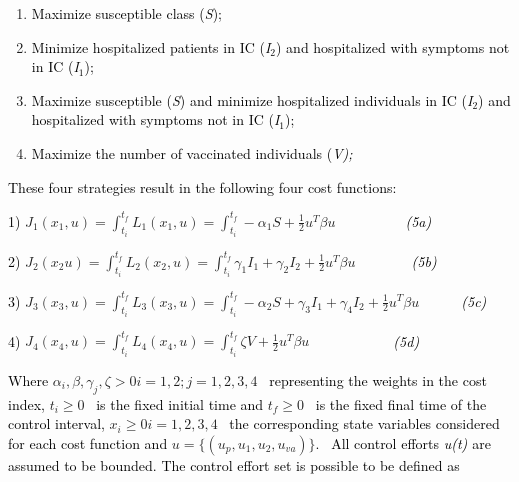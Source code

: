 \documentclass[a4paper]{article}
\providecommand\textsubscript[1]{\ensuremath{{}_{\text{#1}}}}
\begin{document}
\begin{enumerate}
\item \textcolor{black}{Maximize susceptible class (}\textit{\textcolor{black}{S}}\textcolor{black}{); }
\item \textcolor{black}{Minimize hospitalized patients in IC
(}\textit{\textcolor{black}{I}}\textit{\textcolor{black}{\textsubscript{2}}}\textcolor{black}{) and hospitalized with
symptoms not in IC (}\textit{\textcolor{black}{I}}\textit{\textcolor{black}{\textsubscript{1}}}\textcolor{black}{);}
\item \textcolor{black}{Maximize susceptible (}\textit{\textcolor{black}{S}}\textcolor{black}{) and minimize
hospitalized individuals in IC
(}\textit{\textcolor{black}{I}}\textit{\textcolor{black}{\textsubscript{2}}}\textcolor{black}{) and hospitalized with
symptoms not in IC (}\textit{\textcolor{black}{I}}\textit{\textcolor{black}{\textsubscript{1}}}\textcolor{black}{);}
\item \textcolor{black}{Maximize the number of vaccinated individuals (}\textit{\textcolor{black}{V);}}
\end{enumerate}
\textcolor{black}{These four strategies result in the following four cost functions: }

\textcolor{black}{1) } $J_1\left(x_1,u\right)=\int _{t_i}^{t_f}L_1\left(x_1,u\right)=\int _{t_i}^{t_f}-\alpha _1S+\frac
1 2u^T\mathit{\beta u}$\textcolor{black}{\ \ \ \ \ \ \ \ \ \ }\textit{\textcolor{black}{(5a)}}

\textcolor{black}{2) } $J_2\left(x_2u\right)=\int _{t_i}^{t_f}L_2\left(x_2,u\right)=\int _{t_i}^{t_f}\gamma _1I_1+\gamma
_2I_2+\frac 1 2u^T\mathit{\beta u}$\textcolor{black}{\ \ \ \ \ \ \ \ }\textit{\textcolor{black}{(5b)}}

\textcolor{black}{3) } $J_3\left(x_3,u\right)=\int _{t_i}^{t_f}L_3\left(x_3,u\right)=\int _{t_i}^{t_f}-\alpha _2S+\gamma
_3I_1+\gamma _4I_2+\frac 1 2u^T\mathit{\beta u}$\textcolor{black}{\ \ \ \ \ \ }\textit{\textcolor{black}{(5c)}}

\textcolor{black}{4) } $J_4\left(x_4,u\right)=\int _{t_i}^{t_f}L_4\left(x_4,u\right)=\int _{t_i}^{t_f}\mathit{\zeta
V}+\frac 1 2u^T\mathit{\beta u}$\textcolor{black}{\ \ \ \ \ \ \ \ \ \ \ \ }\textit{\textcolor{black}{(5d)}}

\textcolor{black}{Where } $\alpha _i,\beta ,\gamma _j,\zeta >0i=1,2;j=1,2,3,4$ \textcolor{black}{\ representing the
weights in the cost index, } $t_i{\geq}0$ \textcolor{black}{\ is the fixed initial time and } $t_f{\geq}0$
\textcolor{black}{\ is the fixed final time of the control interval, } $x_i{\geq}0i=1,2,3,4$ \textcolor{black}{\ the
corresponding state variables considered for each cost function and }
$u=\{\left(u_p,u_1,u_2,u_{\mathit{va}}\right)\}$\textcolor{black}{. \ All control efforts
}\textit{\textcolor{black}{u(t) }}\textcolor{black}{are assumed to be bounded. The control effort set is possible to be
defined as }
\end{document}
